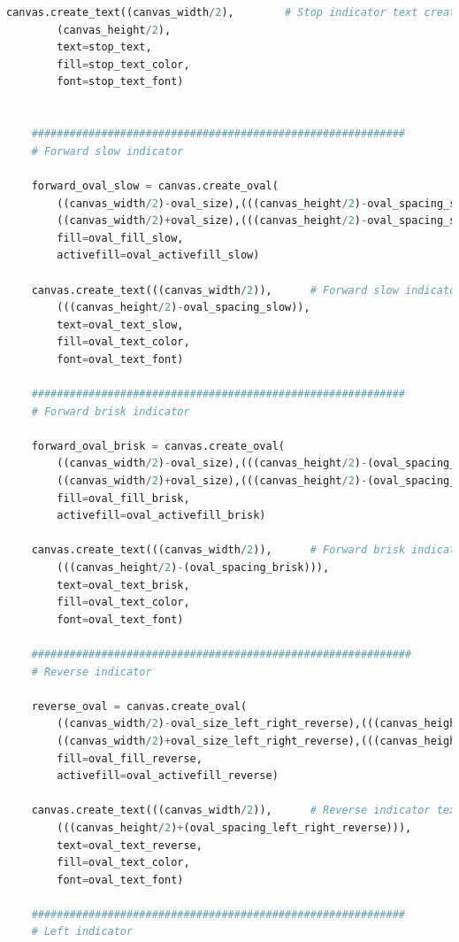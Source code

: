 \documentclass[conference]{IEEEtran}
\begin{document}
\begin{lstlisting}[language=Python, caption=GUI CODE, label=gui_code]
    canvas.create_text((canvas_width/2),        # Stop indicator text creation
        (canvas_height/2),
        text=stop_text, 
        fill=stop_text_color,
        font=stop_text_font)


    ###########################################################
    # Forward slow indicator

    forward_oval_slow = canvas.create_oval(
        ((canvas_width/2)-oval_size),(((canvas_height/2)-oval_spacing_slow)-(oval_size)*(2/3)),
        ((canvas_width/2)+oval_size),(((canvas_height/2)-oval_spacing_slow)+(oval_size)*(2/3)),
        fill=oval_fill_slow,
        activefill=oval_activefill_slow)

    canvas.create_text(((canvas_width/2)),      # Forward slow indicator text creation
        (((canvas_height/2)-oval_spacing_slow)),
        text=oval_text_slow, 
        fill=oval_text_color,
        font=oval_text_font)

    ###########################################################
    # Forward brisk indicator

    forward_oval_brisk = canvas.create_oval(
        ((canvas_width/2)-oval_size),(((canvas_height/2)-(oval_spacing_brisk))-(oval_size)*(2/3)),
        ((canvas_width/2)+oval_size),(((canvas_height/2)-(oval_spacing_brisk))+(oval_size)*(2/3)),
        fill=oval_fill_brisk,
        activefill=oval_activefill_brisk)

    canvas.create_text(((canvas_width/2)),      # Forward brisk indicator text creation
        (((canvas_height/2)-(oval_spacing_brisk))),
        text=oval_text_brisk, 
        fill=oval_text_color, 
        font=oval_text_font)

    ############################################################
    # Reverse indicator

    reverse_oval = canvas.create_oval(
        ((canvas_width/2)-oval_size_left_right_reverse),(((canvas_height/2)+oval_spacing_left_right_reverse)-(oval_size)*(2/3)),
        ((canvas_width/2)+oval_size_left_right_reverse),(((canvas_height/2)+oval_spacing_left_right_reverse)+(oval_size)*(2/3)),
        fill=oval_fill_reverse,
        activefill=oval_activefill_reverse)

    canvas.create_text(((canvas_width/2)),      # Reverse indicator text creation
        (((canvas_height/2)+(oval_spacing_left_right_reverse))),
        text=oval_text_reverse, 
        fill=oval_text_color,
        font=oval_text_font)

    ###########################################################
    # Left indicator


\end{lstlisting}
\end{document}
